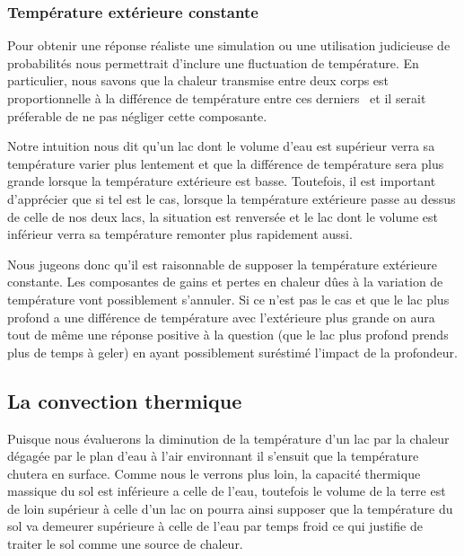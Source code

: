 \documentclass[12pt]{article}
\begin{document}
\subsubsection{Temp\'erature ext\'erieure constante}\label{TempExt}

Pour obtenir une r\'eponse r\'ealiste une simulation ou une utilisation judicieuse de probabilit\'es
nous permettrait d'inclure une fluctuation de temp\'erature. En particulier, nous savons que la
chaleur transmise entre deux corps est proportionnelle \`a la diff\'erence de temp\'erature entre
ces derniers~\cite{Fourier} et il serait pr\'eferable de ne pas n\'egliger cette composante.

Notre intuition nous dit qu'un lac dont le volume d'eau est sup\'erieur verra sa temp\'erature
varier plus lentement et que la diff\'erence de temp\'erature sera plus grande lorsque la
temp\'erature ext\'erieure est basse. Toutefois, il est important d'appr\'ecier que si tel est le
cas, lorsque la temp\'erature ext\'erieure passe au dessus de celle de nos deux lacs, la situation
est renvers\'ee et le lac dont le volume est inf\'erieur verra sa temp\'erature remonter plus
rapidement aussi.

Nous jugeons donc qu'il est raisonnable de supposer la temp\'erature ext\'erieure constante. Les
composantes de gains et pertes en chaleur d\^ues \`a la variation de temp\'erature vont possiblement
s'annuler. Si ce n'est pas le cas et que le lac plus profond a une diff\'erence de temp\'erature
avec l'ext\'erieure plus grande on aura tout de m\^eme une r\'eponse positive \`a la question (que
le lac plus profond prends plus de temps \`a geler) en ayant possiblement sur\'estim\'e l'impact de
la profondeur.

\subsection{La convection thermique}\label{Convec}

Puisque nous \'evaluerons la diminution de la temp\'erature d'un lac par la chaleur d\'egag\'ee par le
plan d'eau \`a l'air environnant il s'ensuit que la temp\'erature chutera en surface. Comme nous le
verrons plus loin, la capacit\'e thermique~\cite{CapTherm} massique du sol est inf\'erieure a celle
de l'eau, toutefois le volume de la terre est de loin sup\'erieur \`a celle d'un lac on pourra ainsi
supposer que la temp\'erature du sol va demeurer sup\'erieure \`a celle de l'eau par temps froid ce
qui justifie de traiter le sol comme une source de chaleur.
\end{document}
